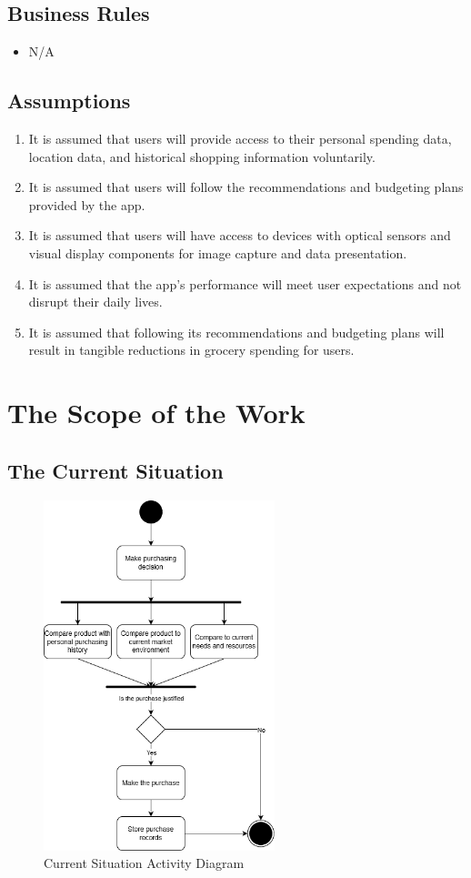 \documentclass[12pt]{article}
\begin{document}
\subsection{Business Rules}
\begin{itemize}
    \item N/A
\end{itemize}
\subsection{Assumptions}
\begin{enumerate}
    \item It is assumed that users will provide access to their personal spending data, location data, and historical shopping information voluntarily.
    \item It is assumed that users will follow the recommendations and budgeting plans provided by the app.
    \item It is assumed that users will have access to devices with optical sensors and visual display components for image capture and data presentation.
    \item It is assumed that the app's performance will meet user expectations and not disrupt their daily lives.
    \item It is assumed that following its recommendations and budgeting plans will result in tangible reductions in grocery spending for users.
\end{enumerate}

\section{The Scope of the Work}
\subsection{The Current Situation}
\begin{figure}[H]
    \centering
    \includegraphics[width=0.6\textwidth]{currentsituation}
    \caption{Current Situation Activity Diagram}
    \label{fig:currentsituation}
\end{figure}
\end{document}
